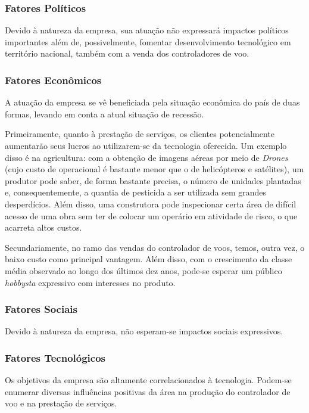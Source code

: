 \subsubsection*{Fatores Políticos}

Devido à natureza da empresa, sua atuação não expressará impactos políticos importantes além de, 
possivelmente, fomentar desenvolvimento tecnológico em território nacional, também com a venda dos controladores de voo.

\subsubsection*{Fatores Econômicos}

A atuação da empresa se vê beneficiada pela situação econômica do país de duas formas, levando em 
conta a atual situação de recessão. 

Primeiramente, quanto à prestação de serviços, os clientes potencialmente aumentarão seus lucros 
ao utilizarem-se da tecnologia oferecida. Um exemplo disso é na agricultura: com a obtenção de 
imagens aéreas por meio de \emph{Drones} (cujo custo de operacional é bastante menor que o de helicópteros 
e satélites), um produtor pode saber, de forma bastante precisa, o número de unidades plantadas e, 
consequentemente, a quantia de pesticida a ser utilizada sem grandes desperdícios. Além disso, uma 
construtora pode inspecionar certa área de difícil acesso de uma obra sem ter de colocar um operário 
em atividade de risco, o que acarreta altos custos.

Secundariamente, no ramo das vendas do controlador de voos, temos, outra vez, o baixo custo como 
principal vantagem. Além disso, com o crescimento da classe média observado ao longo dos últimos 
dez anos, pode-se esperar um público \emph{hobbysta} expressivo com interesses no produto.

\subsubsection*{Fatores Sociais}

Devido à natureza da empresa, não esperam-se impactos sociais expressivos.

\subsubsection*{Fatores Tecnológicos}
	
Os objetivos da empresa são altamente correlacionados à tecnologia. Podem-se enumerar diversas influências 
positivas da área na produção do controlador de voo e na prestação de serviços. 

